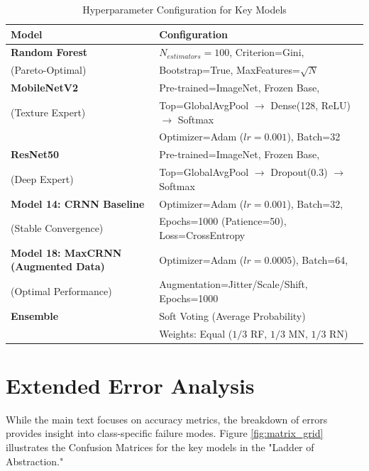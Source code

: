 \documentclass{article}
\begin{document}
\begin{table}[h]
    \centering
    \renewcommand{\arraystretch}{1.5}
    \caption{Hyperparameter Configuration for Key Models}
    \begin{tabular}{l | l}
        \hline
        \textbf{Model} & \textbf{Configuration} \\
        \hline
        \textbf{Random Forest} & $N_{estimators}=100$, Criterion=Gini, \\
        (Pareto-Optimal) & Bootstrap=True, MaxFeatures=$\sqrt{N}$ \\
        \hline
        \textbf{MobileNetV2} & Pre-trained=ImageNet, Frozen Base, \\
        (Texture Expert) & Top=GlobalAvgPool $\rightarrow$ Dense(128, ReLU) $\rightarrow$ Softmax \\
         & Optimizer=Adam ($lr=0.001$), Batch=32 \\
        \hline
        \textbf{ResNet50} & Pre-trained=ImageNet, Frozen Base, \\
        (Deep Expert) & Top=GlobalAvgPool $\rightarrow$ Dropout(0.3) $\rightarrow$ Softmax \\
        \hline
        \textbf{Model 14: CRNN Baseline} & Optimizer=Adam ($lr=0.001$), Batch=32, \\
        (Stable Convergence) & Epochs=1000 (Patience=50), Loss=CrossEntropy \\
        \hline
        \textbf{Model 18: MaxCRNN (Augmented Data)} & Optimizer=Adam ($lr=0.0005$), Batch=64, \\
        (Optimal Performance) & Augmentation=Jitter/Scale/Shift, Epochs=1000 \\
        \hline
        \textbf{Ensemble} & Soft Voting (Average Probability) \\
        & Weights: Equal ($1/3$ RF, $1/3$ MN, $1/3$ RN) \\
        \hline
    \end{tabular}
\end{table}

\clearpage
\section{Extended Error Analysis}
\label{app:matrices}

While the main text focuses on accuracy metrics, the breakdown of errors provides insight into class-specific failure modes. Figure \ref{fig:matrix_grid} illustrates the Confusion Matrices for the key models in the "Ladder of Abstraction."
\end{document}
